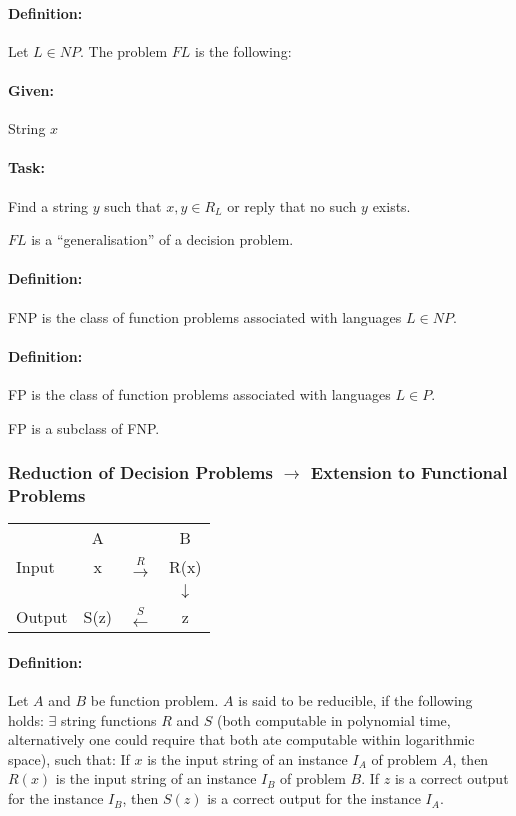 \documentclass[11pt]{article}
\theoremstyle{definition}
\theoremstyle{definition}
\begin{document}
\paragraph{Definition:} Let $ L \in NP $. The problem $ FL $ is the following:
\paragraph{Given:} String $ x $
\paragraph{Task:} Find a string $ y $ such that $ x, y \in R_L $ or reply that no such $ y $ exists.

$ FL $ is a ``generalisation'' of a decision problem.

\paragraph{Definition:} FNP is the class of function problems associated with languages $ L \in NP $.

\paragraph{Definition:} FP is the class of function problems associated with languages $ L \in P $.

FP is a subclass of FNP.

\subsubsection{Reduction of Decision Problems $ \rightarrow $ Extension to Functional Problems}

\begin{tabular}{l c c c}
& A & & B \\
Input & x & $ \overset{R}{\longrightarrow} $ & R(x) \\
& & & $ \downarrow $ \\
Output & S(z) & $ \overset{S}{\longleftarrow} $ & z
\end{tabular}

\paragraph{Definition:} Let $ A $ and $ B $ be function problem. $ A $ is said to be reducible, if the following holds:
$ \exists $ string functions $ R $ and $ S $ (both computable in polynomial time, alternatively one could require that both ate computable within logarithmic space), such that: If $ x $ is the input string of an instance $ I_A $ of problem $ A $, then $ R(x) $ is the input string of an instance $ I_B $ of problem $ B $. If $ z $ is a correct output for the instance $ I_B $, then $ S(z) $ is a correct output for the instance $ I_A $.
\end{document}
